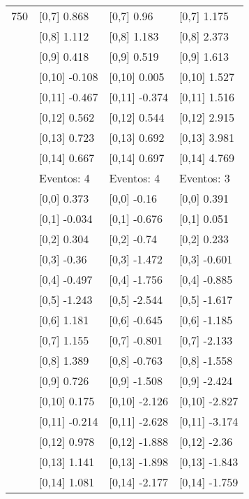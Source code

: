 \begin{table}
\begin{tabular}[t]{llll}
750 & {}[0,7] 0.868 & {}[0,7] 0.96 & {}[0,7] 1.175\\
\addlinespace
 & {}[0,8] 1.112 & {}[0,8] 1.183 & {}[0,8] 2.373\\
 & {}[0,9] 0.418 & {}[0,9] 0.519 & {}[0,9] 1.613\\
 & {}[0,10] -0.108 & {}[0,10] 0.005 & {}[0,10] 1.527\\
 & {}[0,11] -0.467 & {}[0,11] -0.374 & {}[0,11] 1.516\\
 & {}[0,12] 0.562 & {}[0,12] 0.544 & {}[0,12] 2.915\\
\addlinespace
 & {}[0,13] 0.723 & {}[0,13] 0.692 & {}[0,13] 3.981\\
 & {}[0,14] 0.667 & {}[0,14] 0.697 & {}[0,14] 4.769\\
 & Eventos:  4 & Eventos:  4 & Eventos:  3\\
 & {}[0,0] 0.373 & {}[0,0] -0.16 & {}[0,0] 0.391\\
 & {}[0,1] -0.034 & {}[0,1] -0.676 & {}[0,1] 0.051\\
\addlinespace
 & {}[0,2] 0.304 & {}[0,2] -0.74 & {}[0,2] 0.233\\
 & {}[0,3] -0.36 & {}[0,3] -1.472 & {}[0,3] -0.601\\
 & {}[0,4] -0.497 & {}[0,4] -1.756 & {}[0,4] -0.885\\
 & {}[0,5] -1.243 & {}[0,5] -2.544 & {}[0,5] -1.617\\
 & {}[0,6] 1.181 & {}[0,6] -0.645 & {}[0,6] -1.185\\
\addlinespace
1000 & {}[0,7] 1.155 & {}[0,7] -0.801 & {}[0,7] -2.133\\
 & {}[0,8] 1.389 & {}[0,8] -0.763 & {}[0,8] -1.558\\
 & {}[0,9] 0.726 & {}[0,9] -1.508 & {}[0,9] -2.424\\
 & {}[0,10] 0.175 & {}[0,10] -2.126 & {}[0,10] -2.827\\
 & {}[0,11] -0.214 & {}[0,11] -2.628 & {}[0,11] -3.174\\
\addlinespace
 & {}[0,12] 0.978 & {}[0,12] -1.888 & {}[0,12] -2.36\\
 & {}[0,13] 1.141 & {}[0,13] -1.898 & {}[0,13] -1.843\\
 & {}[0,14] 1.081 & {}[0,14] -2.177 & {}[0,14] -1.759\\
\bottomrule
\end{tabular}
\end{table}
